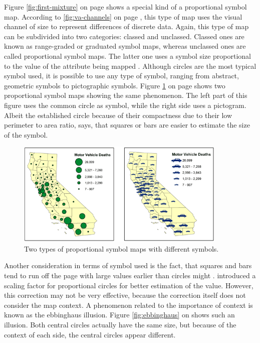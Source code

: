 Figure \ref{fig:first-mixture} on page \pageref{fig:first-mixture} shows a special kind of a proportional symbol map. According to \ref{fig:va-channels} on page \pageref{fig:va-channels}, this type of map uses the visual channel of size to represent differences of discrete data. Again, this type of map can be subdivided into two categories: classed and unclassed. Classed ones are known as range-graded or graduated symbol maps, whereas unclassed ones are called proportional symbol maps. The latter one uses a symbol size proportional to the value of the attribute being mapped .
Although circles are the most typical symbol used, it is possible to use any type of symbol, ranging from abstract, geometric symbols to pictographic symbols. Figure \ref{fig:different-symbols} on page \pageref{fig:different-symbols} shows two proportional symbol maps showing the same phenomenon. The left part of this figure uses the common circle as symbol, while the right side uses a pictogram. Albeit the established circle because of their compactness due to their low perimeter to area ratio, \citeauthor{Dutton.2014} says, that squares or bars are easier to estimate the size of the symbol.


\begin{figure}[!htb]
\centering
\includegraphics[height=5cm,keepaspectratio]{images/psm/symbols.png}
\caption[
    Two types of proportional symbol maps with different symbols .
]{Two types of proportional symbol maps with different symbols.}
\label{fig:different-symbols}
\end{figure}

Another consideration in terms of symbol used is the fact, that squares and bars tend to run off the page with large values earlier than circles might . \citeauthor{FLANNERY1971} introduced a scaling factor for proportional circles for better estimation of the value. However, this correction may not be very effective, because the correction itself does not consider the map context. A phenomenon related to the importance of context is known as the ebbinghaus illusion. Figure \ref{fig:ebbinghaus} on \pageref{fig:ebbinghaus} shows such an illusion. Both central circles actually have the same size, but because of the context of each side, the central circles appear different.

